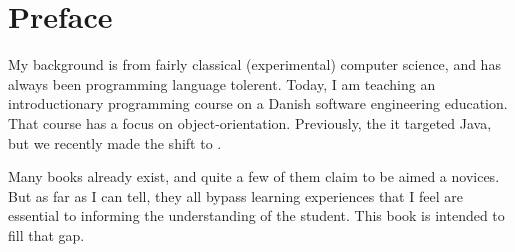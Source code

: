 \chapter*{Preface}

My background is from fairly classical (experimental) computer science, and has always been programming language tolerent. Today, I am teaching an introductionary programming course on a Danish software engineering education. That course has a focus on object-orientation. Previously, the it targeted Java, but we recently made the shift to \csharp.

Many \csharp books already exist, and quite a few of them claim to be aimed a novices. But as far as I can tell, they all bypass learning experiences that I feel are essential to informing the understanding of the student. This book is intended to fill that gap.
